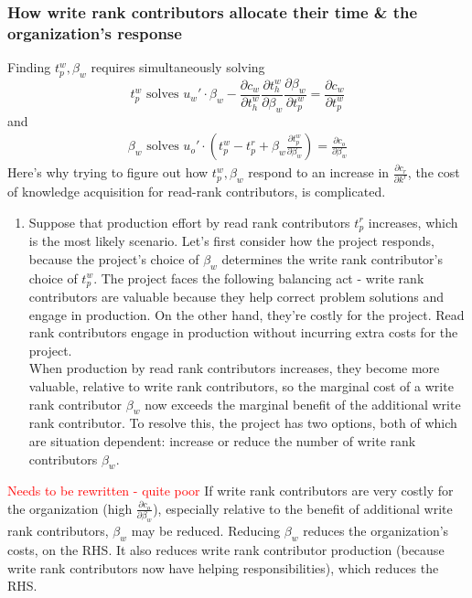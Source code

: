 \documentclass[source/paper/main.tex]{subfiles}
\begin{document}
\subsubsection{How write rank contributors allocate their time \& the organization's response}
Finding $t_p^w, \beta_w$ requires simultaneously solving 
$$t_p^w \text{ solves } u_w' \cdot \beta_w - \frac{\partial c_w}{\partial t_h^w} \frac{\partial t_h^w}{\partial \beta_w}\frac{\partial \beta_w}{\partial t_p^w} = \frac{\partial c_w}{\partial t_p^w} $$
and
\begin{align}
    \beta_w \text{ solves } u_o' \cdot (t_p^w- t_p^r + \beta_w \frac{\partial t_p^w}{\partial \beta_w} ) = \frac{\partial c_o}{\partial \beta_w} 
\end{align}
Here's why trying to figure out how $t_p^w, \beta_w$ respond to an increase in $\frac{\partial c_r}{\partial k^r}$, the cost of knowledge acquisition for read-rank contributors, is complicated. 
\begin{enumerate}
    \item  Suppose that production effort by read rank contributors $t_p^r$ increases, which is the most likely scenario. Let's first consider how the project responds, because the project's choice of $\beta_w$ determines the write rank contributor's choice of $t_p^w$. The project faces the following balancing act - write rank contributors are valuable because they help correct problem solutions and engage in production. On the other hand, they're costly for the project. Read rank contributors engage in production without incurring extra costs for the project. \\
    When production by read rank contributors increases, they become more valuable, relative to write rank contributors, so the marginal cost of a write rank contributor $\beta_w$ now exceeds the marginal benefit of the additional write rank contributor. To resolve this, the project has two options, both of which are situation dependent: increase or reduce the number of write rank contributors $\beta_w$. 
\end{enumerate}
\textcolor{red}{Needs to be rewritten - quite poor}
If write rank contributors are very costly for the organization (high $\frac{\partial c_o}{\partial \beta_w}$), especially relative to the benefit of additional write rank contributors, $\beta_w$ may be reduced. Reducing $\beta_w$ reduces the organization's costs, on the RHS. It also reduces write rank contributor production (because write rank contributors now have helping responsibilities), which reduces the RHS. 
\end{document}
